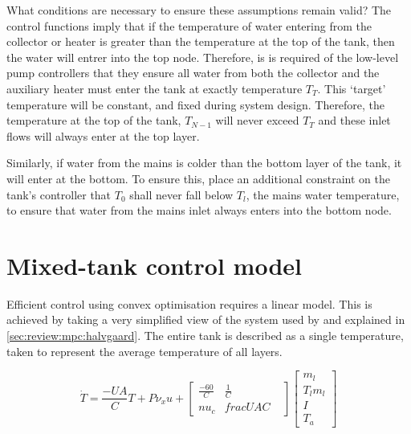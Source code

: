 What conditions are necessary to ensure these assumptions remain valid?
The control functions imply that if the temperature of water entering from the collector or heater is greater than the temperature at the top of the tank, then the water will entrer into the top node.
Therefore, is is required of the low-level pump controllers that they ensure all water from both the collector and the auxiliary heater must enter the tank at exactly temperature $T_T$.
This `target' temperature will be constant, and fixed during system design.
Therefore, the temperature at the top of the tank, $T_{N-1}$ will never exceed $T_T$ and these inlet flows will always enter at the top layer.

Similarly, if water from the mains is colder than the bottom layer of the tank, it will enter at the bottom.
To ensure this, place an additional constraint on the tank's controller that $T_0$ shall never fall below $T_l$, the mains water temperature, to ensure that water from the mains inlet always enters into the bottom node.


\section{Mixed-tank control model}

Efficient control using convex optimisation requires a linear model.
This is achieved by taking a very simplified view of the system used by  and explained in \autoref{sec:review:mpc:halvgaard}.
The entire tank is described as a single temperature, taken to represent the average temperature of all layers.

\begin{equation}
	\label{eq:tdot-halvgaard}
	\dot{T} = \frac{-UA}{C}T + P \nu_x u +
		\left[ \begin{array}{cccc}
			\frac{-60}{C} & \frac{1}{C} & \\nu_c & frac{UA}{C}
		\end{array} \right] \left[ \begin{array}{c}
			m_l \\ T_l m_l \\ I \\ T_a
		\end{array} \right]
\end{equation}

